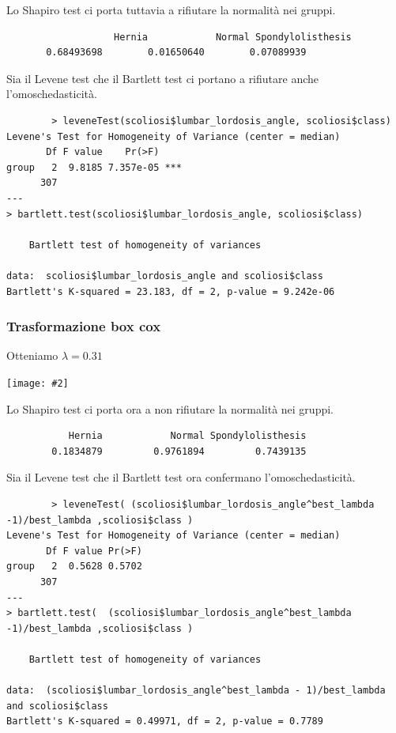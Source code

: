 \documentclass{beamer}
\newcommand{\fg}[2]{%
  \begin{center}
      \texttt{[image: \#2]}%
  \end{center}
}
\begin{document}
\begin{frame}[fragile]
	Lo Shapiro test ci porta tuttavia a rifiutare la normalità nei gruppi.
	\begin{verbatim}
		           Hernia            Normal Spondylolisthesis 
       0.68493698        0.01650640        0.07089939
	\end{verbatim}

	Sia il Levene test che il Bartlett test ci portano a rifiutare anche l'omoschedasticità.
	{\tiny
	\begin{verbatim}
		> leveneTest(scoliosi$lumbar_lordosis_angle, scoliosi$class)
Levene's Test for Homogeneity of Variance (center = median)
       Df F value    Pr(>F)    
group   2  9.8185 7.357e-05 ***
      307                      
---
> bartlett.test(scoliosi$lumbar_lordosis_angle, scoliosi$class)

	Bartlett test of homogeneity of variances

data:  scoliosi$lumbar_lordosis_angle and scoliosi$class
Bartlett's K-squared = 23.183, df = 2, p-value = 9.242e-06
	\end{verbatim}
	}
\end{frame}



\begin{frame}
	\frametitle{Trasformazione box cox}
	Otteniamo $\lambda = 0.31$
	\fg{0.6}{15boxcox}
\end{frame}




\begin{frame}[fragile]
	Lo Shapiro test ci porta ora a non rifiutare la normalità nei gruppi.
	\begin{verbatim}
           Hernia            Normal Spondylolisthesis 
        0.1834879         0.9761894         0.7439135 
	\end{verbatim}

	Sia il Levene test che il Bartlett test ora confermano l'omoschedasticità.
	{\tiny
	\begin{verbatim}
		> leveneTest( (scoliosi$lumbar_lordosis_angle^best_lambda -1)/best_lambda ,scoliosi$class )
Levene's Test for Homogeneity of Variance (center = median)
       Df F value Pr(>F)
group   2  0.5628 0.5702
      307                   
---
> bartlett.test(  (scoliosi$lumbar_lordosis_angle^best_lambda -1)/best_lambda ,scoliosi$class )

	Bartlett test of homogeneity of variances

data:  (scoliosi$lumbar_lordosis_angle^best_lambda - 1)/best_lambda and scoliosi$class
Bartlett's K-squared = 0.49971, df = 2, p-value = 0.7789
	\end{verbatim}
	}
\end{frame}
\end{document}
